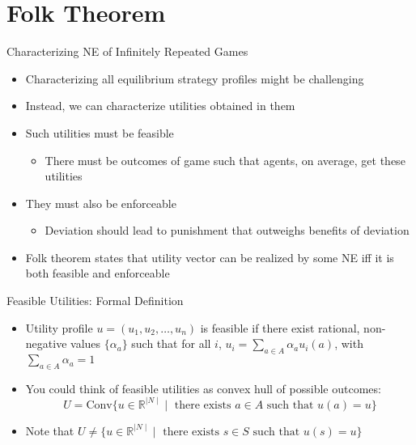 \documentclass[11pt,aspectratio=169,handout]{beamer}
\begin{document}
  
 \section{Folk Theorem}  
  
  \begin{frame}{Characterizing NE of Infinitely Repeated Games}
   \begin{itemize}[<+->]
   \setlength{\itemsep}{0.7em}
    \item Characterizing all equilibrium strategy profiles might be challenging
    \item Instead, we can characterize utilities obtained in them
    \item Such utilities must be \alert{feasible}
    \begin{itemize}[<.->]
     \item There must be outcomes of game such that agents, on average, get these utilities
    \end{itemize}
    \item They must also be \alert{enforceable}
    \begin{itemize}[<.->]
     \item Deviation should lead to punishment that outweighs benefits of deviation
    \end{itemize}
    \item \alert{Folk theorem} states that utility vector can be realized by some NE iff it is both feasible and enforceable
   \end{itemize}
  \end{frame}
  
  \begin{frame}{Feasible Utilities: Formal Definition}
   \begin{itemize}[<+->]
   \setlength{\itemsep}{1.2em}
    \item \alert{Utility profile} $u = (u_1,u_2,\dots,u_n)$ is \alert{feasible} if there exist \alert{rational}, \alert{non-negative} values $\{\alpha_a\}$ such that for all $i$, $u_i = \sum_{a\in A} \alpha_a u_i(a)$, with $\sum_{a\in A} \alpha_a = 1$
    \item You could think of feasible utilities as \alert{convex hull} of possible outcomes:
    $$U = \text{Conv}\{ u \in  \mathbb{R}^{\mid N \mid} \mid \text{ there exists } a \in A \text{ such that } u(a) = u \}$$
    \item Note that $U \neq  \{ u \in  \mathbb{R} ^{\mid N \mid}  \mid \text{ there exists } s \in S \text{ such that } u(s) = u \}$
   \end{itemize}
  \end{frame}
  
\end{document}
